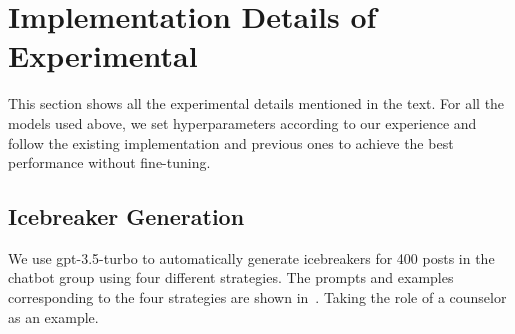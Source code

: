 \section{Implementation Details of Experimental}
\label{apd:exp_details}
This section shows all the experimental details mentioned in the text. For all the models used above, we set hyperparameters according to our experience and follow the existing implementation and previous ones to achieve the best performance without fine-tuning.
 
\subsection{Icebreaker Generation}
\label{apd:icebreaker_ge}
We use gpt-3.5-turbo to automatically generate icebreakers for 400 posts in the chatbot group using four different strategies. The prompts and examples corresponding to the four strategies are shown in~. Taking the role of a counselor as an example.

